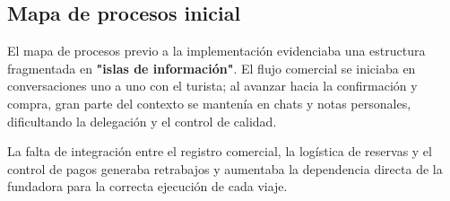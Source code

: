 \subsection{Mapa de procesos inicial}

El mapa de procesos previo a la implementación evidenciaba una estructura fragmentada en \textbf{"islas de información"}. El flujo comercial se iniciaba en conversaciones uno a uno con el turista; al avanzar hacia la confirmación y compra, gran parte del contexto se mantenía en chats y notas personales, dificultando la delegación y el control de calidad.

La falta de integración entre el registro comercial, la logística de reservas y el control de pagos generaba retrabajos y aumentaba la dependencia directa de la fundadora para la correcta ejecución de cada viaje.

